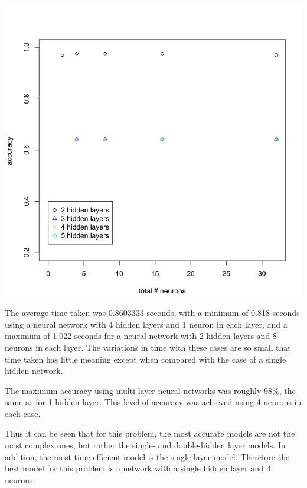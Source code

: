 \documentclass[11pt]{article}
\begin{document}
\begin{enumerate}
\begin{center}
\includegraphics[scale=0.35]{pix/mlp_acc_size}
\end{center}

The average time taken was 0.8603333 seconds, with a minimum of 0.818 seconds using a 
neural network with 4 hidden layers and 1 neuron in each layer, and a maximum of 1.022 
seconds for a neural network with 2 hidden layers and 8 neurons in each layer. The 
variations in time with these cases are so small that time taken has little meaning 
except when compared with the case of a single hidden network. 

The maximum accuracy using multi-layer neural networks was roughly 98\%, the same 
as for 1 hidden layer. This level of accuracy was achieved using 4 neurons in each case.  

Thus it can be seen that for this problem, the most 
accurate models are not the most complex ones, but rather the single- and double-hidden layer 
models. In addition, the most time-efficient model is the single-layer model. Therefore the 
best model for this problem is a network with a single hidden layer and 4 neurons. 
\end{enumerate}
\end{document}
